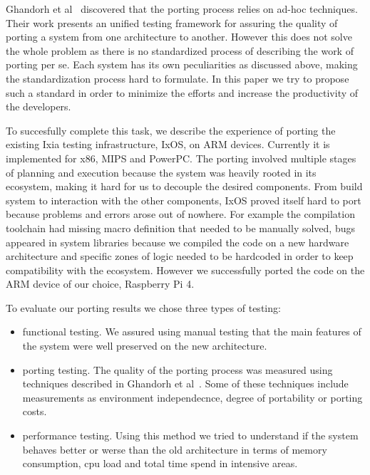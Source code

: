 \documentclass[12pt,a4paper]{report}
\begin{document}
Ghandorh et al~\cite{ghandorh2020systematic} discovered that the porting process relies on ad-hoc
techniques. Their work presents an unified testing framework for assuring the quality of porting
a system from one architecture to another. However this does not solve the whole problem as there
is no standardized process of describing the work of porting per se. Each system has its own
peculiarities as discussed above, making the standardization process hard to formulate. In this
paper we try to propose such a standard in order to minimize the efforts and increase the
productivity of the developers.

To succesfully complete this task, we describe the experience of porting the existing Ixia testing
infrastructure, IxOS, on ARM devices. Currently it is implemented for x86, MIPS and PowerPC. The
porting involved multiple stages of planning and execution because the system was heavily rooted
in its ecosystem, making it hard for us to decouple the desired components. From build system to
interaction with the other components, IxOS proved itself hard to port because problems and errors
arose out of nowhere. For example the compilation toolchain had missing macro definition that needed
to be manually solved, bugs appeared in system libraries because we compiled the code on a new
hardware architecture and specific zones of logic needed to be hardcoded in order to keep
compatibility with the ecosystem. However we successfully ported the code on the ARM device of our
choice, Raspberry Pi 4.

To evaluate our porting results we chose three types of testing:
\begin{itemize}
	\item functional testing. We assured using manual testing that the main features of the
		system were well preserved on the new architecture.
	\item porting testing. The quality of the porting process was measured using techniques
		described in Ghandorh et al~\cite{ghandorh2020systematic}. Some of these techniques
		include measurements as environment independecnce, degree of portability or porting
		costs.
	\item performance testing. Using this method we tried to understand if the system behaves
		better or werse than the old architecture in terms of memory consumption, cpu load
		and total time spend in intensive areas.
\end{itemize}
\end{document}
